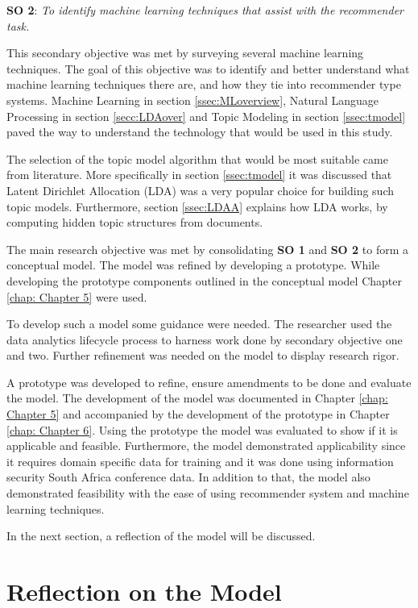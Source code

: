 \textbf{SO 2}: \textit{To identify machine learning techniques that assist with the recommender task.}

This secondary objective was met by surveying several machine learning techniques. The goal of this objective was to identify and better understand what machine learning techniques there are, and how they tie into recommender type systems.
Machine Learning in section \ref{ssec:MLoverview}, Natural Language Processing in section \ref{secc:LDAover} and Topic Modeling in section \ref{ssec:tmodel} paved the way to understand the technology that would be used in this study.

The selection of the topic model algorithm that would be most suitable came from literature. More specifically in section \ref{ssec:tmodel} it was discussed that Latent Dirichlet Allocation (LDA) was a very popular choice for building such topic models. Furthermore, section \ref{ssec:LDAA} explains how LDA works, by computing hidden topic structures from documents.

The main research objective was met by consolidating \textbf{SO 1} and \textbf{SO 2} to form a conceptual model. The model was refined by developing a prototype. While developing the prototype components outlined in the conceptual model Chapter \ref{chap: Chapter 5} were used. 

To develop such a model some guidance were needed. The researcher used the data analytics lifecycle process to harness work done by secondary objective one and two.
Further refinement was needed on the model to display research rigor. 

A prototype was developed to refine, ensure amendments to be done and evaluate the model. The development of the model was documented in Chapter \ref{chap: Chapter 5} and accompanied by the development of the prototype in Chapter \ref{chap: Chapter 6}. Using the prototype the model was evaluated to show if it is applicable and feasible. Furthermore, the model demonstrated applicability since it requires domain specific data for training and it was done using information security South Africa conference data.
In addition to that, the model also demonstrated feasibility with the ease of using recommender system and machine learning techniques.

In the next section, a reflection of the model will be discussed.

\section{Reflection on the Model}

